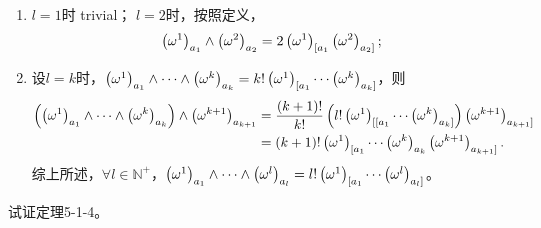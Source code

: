 \begin{xiti}
	\begin{zm}
		\begin{enumerate}
			\item $l=1$时 trivial； $l=2 $时，按照定义，\[ \tensor{\left(\omega^1\right)}{_{a_1}} \wedge \tensor{\left(\omega^2\right)}{_{a_2}} = 2 \tensor{\left(\omega^1\right)}{_{[a_1}} \tensor{\left(\omega^2\right)}{_{a_2 ]}}; \]
			\item 设$l=k$时，$\tensor{\left( \omega^1 \right)}{_{a_1}} \wedge \cdots \wedge \tensor{\left( \omega^k \right)}{_{a_k}} = k! \tensor{\left( \omega^1 \right)}{_{[a_1}} \cdots \tensor{\left( \omega^k \right)}{_{a_k]}} $，则
			\begin{align*}
			\left(\tensor{\left( \omega^1 \right)}{_{a_1}} \wedge \cdots \wedge \tensor{\left( \omega^k \right)}{_{a_k}}\right) \wedge \tensor{\left(\omega^{k+1}\right)}{_{a_{k+1}}} &= \frac{\left(k+1\right)!}{k!} \left(l! \tensor{\left( \omega^1 \right)}{_{[[a_1}} \cdots \tensor{\left( \omega^k \right)}{_{a_k]}}\right) \tensor{\left(\omega^{k+1}\right)}{_{a_{k+1}]}}\\
			&= \left(k+1\right)! \tensor{\left( \omega^1 \right)}{_{[a_1}} \cdots \tensor{\left( \omega^k \right)}{_{a_k}} \tensor{\left(\omega^{k+1}\right)}{_{a_{k+1}]}}.
			\end{align*}
			综上所述，$\forall l \in \mathbb{N}^+ $，$\tensor{\left( \omega^1 \right)}{_{a_1}} \wedge \cdots \wedge \tensor{\left( \omega^l \right)}{_{a_l}} = l! \tensor{\left( \omega^1 \right)}{_{[a_1}} \cdots \tensor{\left( \omega^l \right)}{_{a_l]}}$。
		\end{enumerate}
	\end{zm}

	\item 试证定理5-1-4。


\end{xiti}
